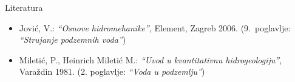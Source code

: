 \documentclass{beamer}
\begin{document}
%
\begin{frame}{Literatura}
\begin{itemize}
\item Jović, V.: \emph{``Osnove hidromehanike''}, Element, Zagreb 2006.
(9.~poglavlje: \emph{``Strujanje podzemnih voda''}) 
\item Miletić, P., Heinrich Miletić M.: \emph{``Uvod u kvantitativnu hidrogeologiju''},
Varaždin 1981. (2. poglavlje: \emph{``Voda u podzemlju''})\vfill{}
 \vfill{}
 \vfill{}
 \vfill{}
 \vfill{}
 
\end{itemize}
\end{frame}
\end{document}
